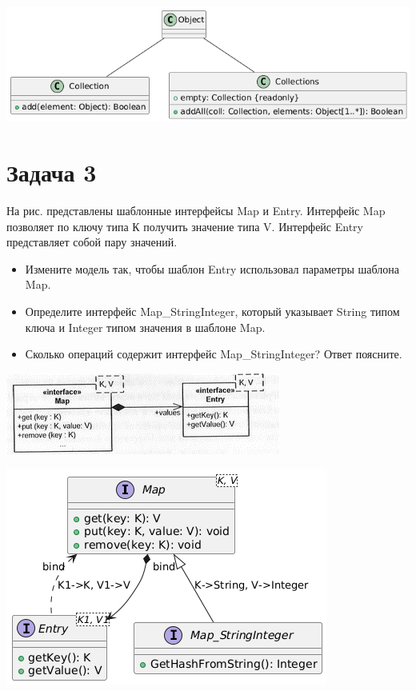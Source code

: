 \documentclass{article}
\begin{document}
\includegraphics[width=\textwidth]{2.png}

\section{Задача 3}
На рис. представлены шаблонные интерфейсы Map и Entry. Интерфейс Map позволяет по ключу типа К получить значение типа V. Интерфейс Entry представляет собой пару значений.

\begin{itemize}
    \item Измените модель так, чтобы шаблон Entry использовал параметры шаблона Map.
    \item Определите интерфейс Map\_StringInteger, который указывает String типом ключа и Integer типом значения в шаблоне Map.
    \item Сколько операций содержит интерфейс Map\_StringInteger? Ответ поясните.
\end{itemize}

\includegraphics[width=\textwidth]{task3.png}

\includegraphics[width=\textwidth]{3.png}
\end{document}
